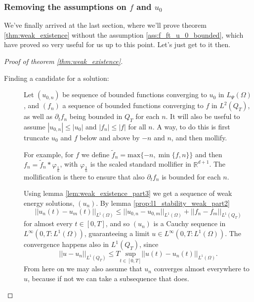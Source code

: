 \documentclass[11pt, a4paper]{article}
\begin{document}
\subsubsection{Removing the assumptions on $f$ and $u_0$}
We've finally arrived at the last section, where we'll prove theorem \ref{thm:weak_existence} without the assumption \ref{ass:f_ft_u_0_bounded}, which have proved so very useful for us up to this point. Let's just get to it then.

\begin{proof}[Proof of theorem \ref{thm:weak_existence}]



\begin{description}
\item[Finding a candidate for a solution:]
Let $(u_{0,n})$ be sequence of bounded functions converging to $u_0$ in $L_{\Psi}(\Omega)$, and $(f_n)$ a sequence of bounded functions converging to $f$ in $L^2(Q_T)$, as well as $\partial_t f_n$ being bounded in $Q_T$ for each $n$. It will also be useful to assume $|u_{0,n}| \leq |u_0|$ and $|f_n| \leq |f|$ for all $n$.
A way, to do this is first truncate $u_0$ and $f$ below and above by $-n$ and $n$, and then mollify.

For example, for $f$ we define $\tilde{f}_n = \mathrm{max}\{ -n, \mathrm{\min}\{f,n\}\}$ and then $f_n = \tilde{f}_n * \varphi_{\frac{1}{n}}$, with $\varphi_{\frac{1}{n}}$ is the scaled standard mollifier in $\mathbb{R}^{d+1}$. The mollification is there to ensure that also $\partial_t f_n$ is bounded for each $n$.

Using lemma \ref{lem:weak_existence_part3} we get a sequence of weak energy solutions, $(u_n)$. By lemma \ref{prop:l1_stability_weak_part2}
\begin{equation*}
||u_n(t) - u_m(t)||_{L^1(\Omega)} \leq ||u_{0,n} - u_{0,m}||_{L^1(\Omega)} + ||f_n - f_m||_{L^1(Q_T)}
\end{equation*}
for almost every $t \in [0,T]$, and so $(u_n)$ is a Cauchy sequence in $L^\infty(0,T: L^1(\Omega))$, guaranteeing a limit $u \in L^\infty(0,T: L^1(\Omega))$. The convergence happens also in $L^1(Q_T)$, since
\begin{equation*}
||u - u_n||_{L^1(Q_T)} \leq T\underset{t \in [0,T]}{\mathrm{sup}}||u(t) - u_n(t)||_{L^1(\Omega)}.
\end{equation*}
From here on we may also assume that $u_n$ converges almost everywhere to $u$, because if not we can take a subsequence that does.


\end{description}
\end{proof}
\end{document}
